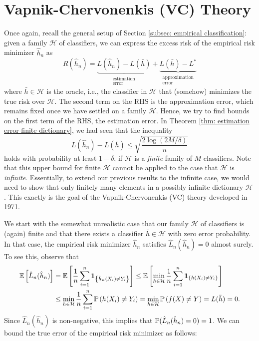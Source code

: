 \chapter{Vapnik-Chervonenkis (VC) Theory}
\label{ch: VC theory}

Once again, recall the general setup of Section \ref{subsec: empirical classification}: given a family $\mathcal{H}$ of classifiers, we can express the excess risk of the empirical risk minimizer $\hat h_n$ as
\[
    R(\hat h_n) = \underbrace{L(\hat h_n) - L(\bar h)}_{\substack{\text{estimation} \\ \text{error}}} + \underbrace{L(\bar h) - L^*}_{\substack{\text{approximation} \\ \text{error}}}
\]
where $\bar h \in \mathcal{H}$ is the oracle, i.e., the classifier in $\mathcal{H}$ that (somehow) minimizes the true risk over $\mathcal{H}$. The second term on the RHS is the approximation error, which remains fixed once we have settled on a family $\mathcal{H}$. Hence, we try to find bounds on the first term of the RHS, the estimation error. In Theorem \ref{thm: estimation error finite dictionary}, we had seen that the inequality
\[
    L(\hat h_n) - L(\bar h) \leq \sqrt{\frac{2 \log(2M / \delta)}{n}}
\]
holds with probability at least $1 - \delta$, if $\mathcal{H}$ is a \emph{finite} family of $M$ classifiers. Note that this upper bound for finite $\mathcal{H}$ cannot be applied to the case that $\mathcal{H}$ is \emph{infinite}. Essentially, to extend our previous results to the infinite case, we would need to show that only finitely many elements in a possibly infinite dictionary $\mathcal{H}$ . This exactly is the goal of the Vapnik-Chervonenkis (VC) theory developed in 1971.

We start with the somewhat unrealistic case that our family $\mathcal{H}$ of classifiers is (again) finite and that there exists a classifier $\bar h \in \mathcal{H}$ with zero error probability. In that case, the empirical risk minimizer $\hat h_n$ satisfies $\hat L_n(\hat h_n) = 0$ almost surely. To see this, observe that
\begin{align*}
    \Ex{\hat L_n(\hat h_n)} &= \Ex{\frac{1}{n} \sum_{i=1}^n \indSet{\hat h_n(X_i) \neq Y_i}} \leq \Ex{\min_{h \in \mathcal{H}} \frac{1}{n} \sum_{i=1}^n \indSet{h(X_i) \neq Y_i}} \\
        &\leq \min_{h \in \mathcal{H}} \frac{1}{n} \sum_{i=1}^n \Pr{h(X_i) \neq Y_i} = \min_{h \in \mathcal{H}} \Pr{f(X) \neq Y} = L(\bar h) = 0.
\end{align*}
Since $\hat L_n(\hat h_n)$ is non-negative, this implies that $\P(\hat L_n(\hat h_n) = 0) = 1$. We can bound the true error of the empirical risk minimizer as follows:

